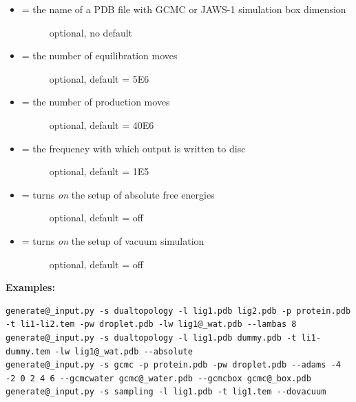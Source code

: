\documentclass[letterpaper,10pt,english]{manual}
\begin{document}
\begin{itemize}
\item {} \begin{description}
\item[{ = the name of a PDB file with GCMC or JAWS-1 simulation box dimension}] \leavevmode
optional, no default

\end{description}

\item {} \begin{description}
\item[{ = the number of equilibration moves}] \leavevmode
optional, default = 5E6

\end{description}

\item {} \begin{description}
\item[{ = the number of production moves}] \leavevmode
optional, default = 40E6

\end{description}

\item {} \begin{description}
\item[{ = the frequency with which output is written to disc}] \leavevmode
optional, default = 1E5

\end{description}

\item {} \begin{description}
\item[{ = turns \emph{on} the setup of absolute free energies}] \leavevmode
optional, default = off

\end{description}

\item {} \begin{description}
\item[{ = turns \emph{on} the setup of vacuum simulation}] \leavevmode
optional, default = off

\end{description}

\end{itemize}

\textbf{Examples:}

\begin{Verbatim}[commandchars=@\[\]]
generate@_input.py -s dualtopology -l lig1.pdb lig2.pdb -p protein.pdb -t li1-li2.tem -pw droplet.pdb -lw lig1@_wat.pdb --lambas 8
generate@_input.py -s dualtopology -l lig1.pdb dummy.pdb -t li1-dummy.tem -lw lig1@_wat.pdb --absolute
generate@_input.py -s gcmc -p protein.pdb -pw droplet.pdb --adams -4 -2 0 2 4 6 --gcmcwater gcmc@_water.pdb --gcmcbox gcmc@_box.pdb
generate@_input.py -s sampling -l lig1.pdb -t lig1.tem --dovacuum
\end{Verbatim}
\end{document}
